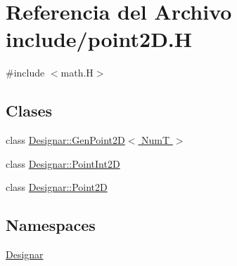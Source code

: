 \hypertarget{point2_d_8_h}{}\section{Referencia del Archivo include/point2D.H}
\label{point2_d_8_h}
{\ttfamily \#include $<$math.\+H$>$}\newline
\subsection*{Clases}
\begin{DoxyCompactItemize}
\item 
class \hyperlink{class_designar_1_1_gen_point2_d}{Designar\+::\+Gen\+Point2\+D$<$ Num\+T $>$}
\item 
class \hyperlink{class_designar_1_1_point_int2_d}{Designar\+::\+Point\+Int2D}
\item 
class \hyperlink{class_designar_1_1_point2_d}{Designar\+::\+Point2D}
\end{DoxyCompactItemize}
\subsection*{Namespaces}
\begin{DoxyCompactItemize}
\item 
 \hyperlink{namespace_designar}{Designar}
\end{DoxyCompactItemize}
